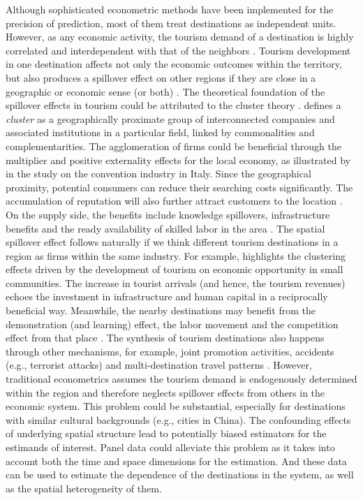 \documentclass[11pt,a4paper]{amsart}
\theoremstyle{plain}
\theoremstyle{definition}
\begin{document}
\noindent Although sophisticated econometric methods have been implemented for the precision of prediction, most of them treat destinations as independent units. However, as any economic activity, the tourism demand of a destination is highly correlated and interdependent with that of the neighbors \parencite{longPoolingTourismDemand2019}. Tourism development in one destination affects not only the economic outcomes within the territory, but also produces a spillover effect on other regions if they are close in a geographic or economic sense (or both) \parencite{liTourismRegionalIncome2016}. The theoretical foundation of the spillover effects in tourism could be attributed to the cluster theory \parencite{kimVisitorFlowSpillover2022}. \textcite{porterCompetition2008} defines a \textit{cluster} as a geographically proximate group of interconnected companies and associated institutions in a particular field, linked by commonalities and complementarities. The agglomeration of firms could be beneficial through the multiplier and positive externality effects for the local economy, as illustrated by \textcite{berniniConventionIndustryDestination2009} in the study on the convention industry in Italy. Since the geographical proximity, potential consumers can reduce their searching costs significantly. The accumulation of reputation will also further attract customers to the location \parencite{kuahClusterTheoryPractice2002}. On the supply side, the benefits include knowledge spillovers, infrastructure benefits and the ready availability of skilled labor in the area \parencite{kuahClusterTheoryPractice2002}. The spatial spillover effect follows naturally if we think different tourism destinations in a region as firms within the same industry. For example, \textcite{michaelTourismMicroClusters2003} highlights the clustering effects driven by the development of tourism  on economic opportunity in small communities. The increase in tourist arrivals (and hence, the tourism revenues) echoes the investment in infrastructure and human capital in a reciprocally beneficial way. Meanwhile, the nearby destinations may benefit from the demonstration (and learning) effect, the labor movement and the competition effect from that place \parencite{longPoolingTourismDemand2019}. The synthesis of tourism destinations also happens through other mechanisms, for example, joint promotion activities, accidents (e.g., terrorist attacks) and multi-destination travel patterns \parencite{yangSpatialEconometricApproach2012}. However, traditional econometrics assumes the tourism demand is endogenously determined within the region and therefore neglects spillover effects from others in the economic system. This problem could be substantial, especially for destinations with similar cultural backgrounds (e.g., cities in China). The confounding effects of underlying spatial structure lead to potentially biased estimators for the estimands of interest. Panel data could alleviate this problem as it takes into account both the time and space dimensions for the estimation. And these data can be used to estimate the dependence of the destinations in the system, as well as the spatial heterogeneity of them. 
\end{document}
